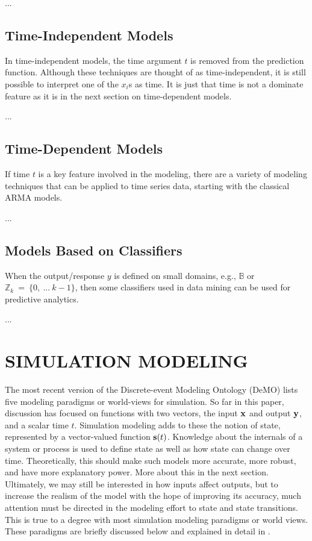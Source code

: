 \documentclass{wscpaperproc}
\theoremstyle{wsc}
\begin{document}
...

\subsection{Time-Independent Models}

In time-independent models, the time argument $t$ is removed from the prediction function.
Although these techniques are thought of as time-independent,
it is still possible to interpret one of the $x_i$s as time.
It is just that time is not a dominate feature as it is in the next
section on time-dependent models.

...

\subsection{Time-Dependent Models}

If time $t$ is a key feature involved in the modeling, there are a variety
of modeling techniques that can be applied to time series data, starting
with the classical ARMA models.

...

\subsection{Models Based on Classifiers}

When the output/response $y$ is defined on small domains, e.g., ${\mathbb B}$
or ${\mathbb Z}_k ~ = ~ \{0, ~ ... ~ k-1\}$, then some classifiers used in data mining can be used for
predictive analytics.

...

\section{SIMULATION MODELING}

The most recent version of the Discrete-event Modeling Ontology (DeMO)
lists five modeling paradigms or world-views for simulation.
So far in this paper, discussion has focused on functions with two
vectors, the input ${\bf x}$ and output ${\bf y}$, and a scalar time $t$.
Simulation modeling adds to these the notion of state,
represented by a vector-valued function ${\bf s}(t)$.
Knowledge about the internals of a system or process
is used to define state as well as how state can change over time.
Theoretically, this should make such models more accurate,
more robust, and have more explanatory power.
More about this in the next section. 
Ultimately, we may still be interested in how inputs affect
outputs, but to increase the realism of the model with the
hope of improving its accuracy, much attention must be
directed in the modeling effort to state and state transitions.
This is true to a degree with most simulation modeling paradigms or world views.
These paradigms are briefly discussed below and explained
in detail in .
\end{document}
